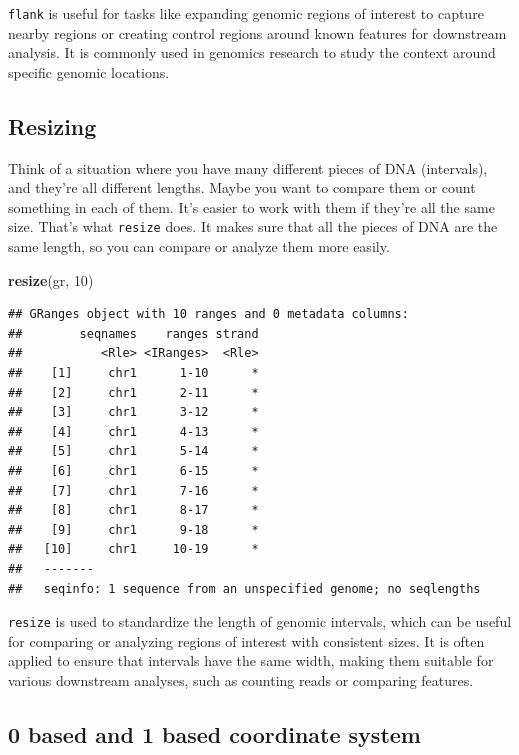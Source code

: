 \documentclass[
]{book}
\newenvironment{Shaded}{\begin{snugshade}}{\end{snugshade}}
\newcommand{\DecValTok}[1]{\textcolor[rgb]{0.00,0.00,0.81}{#1}}
\newcommand{\FunctionTok}[1]{\textcolor[rgb]{0.13,0.29,0.53}{\textbf{#1}}}
\newcommand{\NormalTok}[1]{#1}
\begin{document}
\texttt{flank} is useful for tasks like expanding genomic regions of interest to capture nearby regions or creating control regions around known features for downstream analysis. It is commonly used in genomics research to study the context around specific genomic locations.

\hypertarget{resizing}{%
\subsection{Resizing}\label{resizing}}

Think of a situation where you have many different pieces of DNA (intervals), and they're all different lengths. Maybe you want to compare them or count something in each of them. It's easier to work with them if they're all the same size. That's what \texttt{resize} does. It makes sure that all the pieces of DNA are the same length, so you can compare or analyze them more easily.

\begin{Shaded}
\begin{Highlighting}[]
\FunctionTok{resize}\NormalTok{(gr, }\DecValTok{10}\NormalTok{)}
\end{Highlighting}
\end{Shaded}

\begin{verbatim}
## GRanges object with 10 ranges and 0 metadata columns:
##        seqnames    ranges strand
##           <Rle> <IRanges>  <Rle>
##    [1]     chr1      1-10      *
##    [2]     chr1      2-11      *
##    [3]     chr1      3-12      *
##    [4]     chr1      4-13      *
##    [5]     chr1      5-14      *
##    [6]     chr1      6-15      *
##    [7]     chr1      7-16      *
##    [8]     chr1      8-17      *
##    [9]     chr1      9-18      *
##   [10]     chr1     10-19      *
##   -------
##   seqinfo: 1 sequence from an unspecified genome; no seqlengths
\end{verbatim}

\texttt{resize} is used to standardize the length of genomic intervals, which can be useful for comparing or analyzing regions of interest with consistent sizes. It is often applied to ensure that intervals have the same width, making them suitable for various downstream analyses, such as counting reads or comparing features.

\hypertarget{based-and-1-based-coordinate-system}{%
\subsection{0 based and 1 based coordinate system}\label{based-and-1-based-coordinate-system}}
\end{document}

